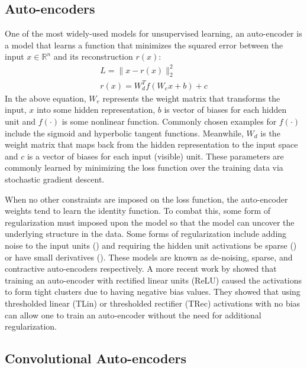 \documentclass{article} \usepackage{iclr2015,times}
\begin{document}
\subsection{Auto-encoders}

One of the most widely-used models for unsupervised learning, an auto-encoder is a model that learns a function that minimizes the squared error between the input $x \in \mathbb{R}^n$ and its reconstruction $r(x)$:
\begin{gather}
L = \| x - r(x) \|_{2}^{2} \\
r(x) = W_{d}^{T}f(W_{e}x+b)+c
\label{eq:ae_recon}
\end{gather}
In the above equation, $W_{e}$ represents the weight matrix that transforms the input, $x$ into some hidden representation, $b$ is vector of biases for each hidden unit and $f(\cdot)$ is some nonlinear function. Commonly chosen examples for $f(\cdot)$ include the sigmoid and hyperbolic tangent functions. Meanwhile, $W_{d}$ is the weight matrix that maps back from the hidden representation to the input space and $c$ is a vector of biases for each input (visible) unit. These parameters are commonly learned by minimizing the loss function over the training data via stochastic gradient descent.

When no other constraints are imposed on the loss function, the auto-encoder weights tend to learn the identity function. To combat this, some form of regularization must imposed upon the model so that the model can uncover the underlying structure in the data. Some forms of regularization include adding noise to the input units (\citet{vincent2010stacked}) and requiring the hidden unit activations be sparse (\citet{coates2011analysis}) or have small derivatives (\citet{rifai2011contractive}). These models are known as de-noising, sparse, and contractive auto-encoders respectively. A more recent work by \citet{memisevic2014zero} showed that training an auto-encoder with rectified linear units (ReLU) caused the activations to form tight clusters due to having negative bias values. They showed that using thresholded linear (TLin) or thresholded rectifier (TRec) activations with no bias can allow one to train an auto-encoder without the need for additional regularization.

\subsection{Convolutional Auto-encoders}
\end{document}
